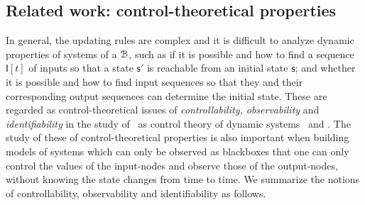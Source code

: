 

\subsection{Related work: control-theoretical properties}
 In general, the updating rules are complex and it is difficult to analyze dynamic properties of systems of a {\BCN} ${\mathcal{B}}$, such as if it is possible and how to  find a sequence $\mathsf{I}[t]$ of inputs so that a state $\mathsf{s}'$ is reachable from an initial state $\mathsf{s}$;  and whether it is possible and how to find input sequences so that  they and their corresponding output sequences can  determine the initial state.  These are regarded as control-theoretical issues of {\em controllability, observability} and {\em identifiability} in the study of \BCNs\ as  control theory of dynamic systems~\cite{Akutsu2007Control,cheng2009controllability, Zhao2010Input, Cheng2011Identification, Cheng2011Analysis} and \cite{Fornasini2013Observability}.
The study  of these of control-theoretical properties is also important when building {\BCN} models of systems which can only be observed as blackboxes that one can only  control the  values of  the input-nodes and observe those of the output-nodes, without knowing  the state changes  from time to time.   We summarize  the notions of controllability, observability and  identifiability as follows.
  
